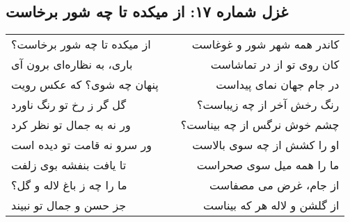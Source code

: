 \begin{center}
\section*{غزل شماره ۱۷: از میکده تا چه شور برخاست}
\label{sec:017}
\begin{longtable}{l p{0.5cm} r}
از میکده تا چه شور برخاست؟
&&
کاندر همه شهر شور و غوغاست
\\
باری، به نظاره‌ای برون آی
&&
کان روی تو از در تماشاست
\\
پنهان چه شوی؟ که عکس رویت
&&
در جام جهان نمای پیداست
\\
گل گر ز رخ تو رنگ ناورد
&&
رنگ رخش آخر از چه زیباست؟
\\
ور نه به جمال تو نظر کرد
&&
چشم خوش نرگس از چه بیناست؟
\\
ور سرو نه قامت تو دیده است
&&
او را کشش از چه سوی بالاست
\\
تا یافت بنفشه بوی زلفت
&&
ما را همه میل سوی صحراست
\\
ما را چه ز باغ لاله و گل؟
&&
از جام، غرض می مصفاست
\\
جز حسن و جمال تو نبیند
&&
از گلشن و لاله هر که بیناست
\\
\end{longtable}
\end{center}
